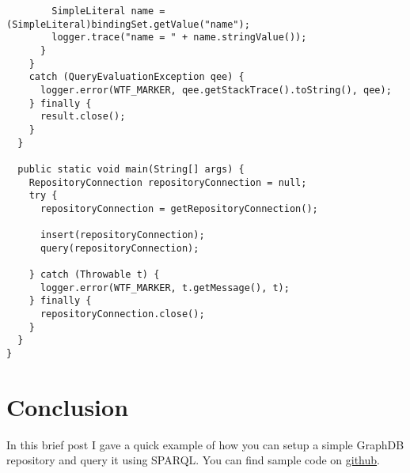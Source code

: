 \documentclass{amsart}
\begin{document}
\begin{small}
\begin{verbatim}
        SimpleLiteral name = (SimpleLiteral)bindingSet.getValue("name");
        logger.trace("name = " + name.stringValue());
      }
    }
    catch (QueryEvaluationException qee) {
      logger.error(WTF_MARKER, qee.getStackTrace().toString(), qee);
    } finally {
      result.close();
    }    
  }  
  
  public static void main(String[] args) {
    RepositoryConnection repositoryConnection = null;
    try {   
      repositoryConnection = getRepositoryConnection();
      
      insert(repositoryConnection);
      query(repositoryConnection);      
      
    } catch (Throwable t) {
      logger.error(WTF_MARKER, t.getMessage(), t);
    } finally {
      repositoryConnection.close();
    }
  }  
}
\end{verbatim}
\end{small}

\section{Conclusion}
    In this brief post I gave a quick example of how you can setup a simple GraphDB repository and query it using SPARQL. You can find sample code on
\href{https://github.com/henrietteharmse/henrietteharmse/tree/master/blog/tutorial/graphdb/source/rdf4j}{github}.
  
  
  
 
\end{document}
